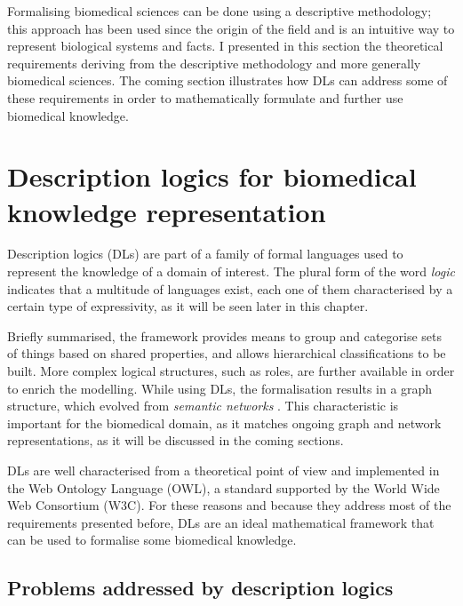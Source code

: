 Formalising biomedical sciences can be done using a descriptive methodology; this approach has been used since the origin of the field and is an intuitive way to represent biological systems and facts. I presented in this section the theoretical requirements deriving from the descriptive methodology and more generally biomedical sciences. The coming section illustrates how DLs can address some of these requirements in order to mathematically formulate and further use biomedical knowledge.

\section{Description logics for biomedical knowledge representation}

Description logics (DLs) are part of a family of formal languages used to represent the knowledge of a domain of interest. The plural form of the word \emph{logic} indicates that a multitude of languages exist, each one of them characterised by a certain type of expressivity, as it will be seen later in this chapter.

Briefly summarised, the framework provides means to group and categorise sets of things based on shared properties, and allows hierarchical classifications to be built. More complex logical structures, such as roles, are further available in order to enrich the modelling. While using DLs, the formalisation results in a graph structure, which evolved from \emph{semantic networks} \citep{allen1982s}. This characteristic is important for the biomedical domain, as it matches ongoing graph and network representations, as it will be discussed in the coming sections.

DLs are well characterised from a theoretical point of view and implemented in the Web Ontology Language (OWL), a standard supported by the World Wide Web Consortium (W3C). For these reasons and because they address most of the requirements presented before, DLs are an ideal mathematical framework that can be used to formalise some biomedical knowledge.

\subsection{Problems addressed by description logics}

